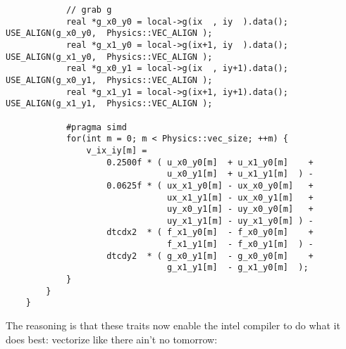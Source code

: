 {\begin{lstlisting}
            // grab g
            real *g_x0_y0 = local->g(ix  , iy  ).data();   USE_ALIGN(g_x0_y0,  Physics::VEC_ALIGN );
            real *g_x1_y0 = local->g(ix+1, iy  ).data();   USE_ALIGN(g_x1_y0,  Physics::VEC_ALIGN );
            real *g_x0_y1 = local->g(ix  , iy+1).data();   USE_ALIGN(g_x0_y1,  Physics::VEC_ALIGN );
            real *g_x1_y1 = local->g(ix+1, iy+1).data();   USE_ALIGN(g_x1_y1,  Physics::VEC_ALIGN );

            #pragma simd
            for(int m = 0; m < Physics::vec_size; ++m) {
                v_ix_iy[m] =
                    0.2500f * ( u_x0_y0[m]  + u_x1_y0[m]    +
                                u_x0_y1[m]  + u_x1_y1[m]  ) -
                    0.0625f * ( ux_x1_y0[m] - ux_x0_y0[m]   +
                                ux_x1_y1[m] - ux_x0_y1[m]   +
                                uy_x0_y1[m] - uy_x0_y0[m]   +
                                uy_x1_y1[m] - uy_x1_y0[m] ) -
                    dtcdx2  * ( f_x1_y0[m]  - f_x0_y0[m]    +
                                f_x1_y1[m]  - f_x0_y1[m]  ) -
                    dtcdy2  * ( g_x0_y1[m]  - g_x0_y0[m]    +
                                g_x1_y1[m]  - g_x1_y0[m]  );                    
            }
        }
    }
\end{lstlisting}
}

The reasoning is that these traits now enable the intel compiler to do what it does best: vectorize like there ain't no tomorrow:

